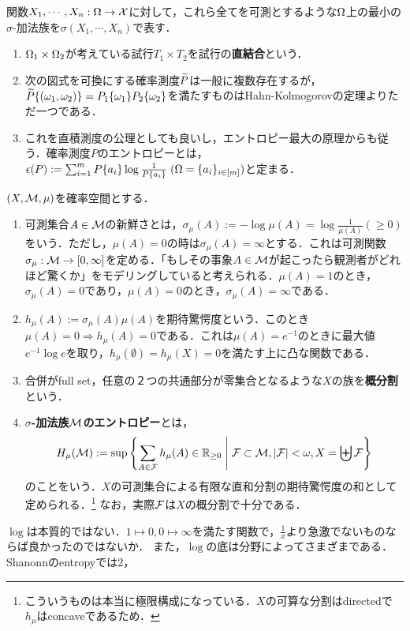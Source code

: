 \documentclass[uplatex,dvipdfmx]{jsreport}
\begin{document}
\begin{definition}
    関数$X_1,\cdots,X_n:\Omega\to\mathcal{X}$に対して，これら全てを可測とするような$\Omega$上の最小の$\sigma$-加法族を$\sigma(X_1,\cdots,X_n)$で表す．
\end{definition}

\begin{definition}\mbox{}
    \begin{enumerate}
        \item $\Omega_1\times\Omega_2$が考えている試行$T_1\times T_2$を試行の\textbf{直結合}という．
        \item 次の図式を可換にする確率測度$\widetilde{P}$は一般に複数存在するが，$\widetilde{P}\{(\omega_1,\omega_2)\}=P_1\{\omega_1\}P_2\{\omega_2\}$を満たすものはHahn-Kolmogorovの定理よりただ一つである．
        \item これを直積測度の公理としても良いし，エントロピー最大の原理からも従う．確率測度$P$のエントロピーとは，$\epsilon(P):=\sum^m_{i=1}P\{a_i\}\log\frac{1}{P\{a_i\}}\;(\Omega=\{a_i\}_{i\in[m]})$と定まる．
    \end{enumerate}
\end{definition}

\begin{definition}
    $(X,\mathcal{M},\mu)$を確率空間とする．
    \begin{enumerate}
        \item 可測集合$A\in\mathcal{M}$の新鮮さとは，$\sigma_\mu(A):=-\log\mu(A)=\log\frac{1}{\mu(A)}(\ge0)$をいう．ただし，$\mu(A)=0$の時は$\sigma_\mu(A)=\infty$とする．これは可測関数$\sigma_\mu:\mathcal{M}\to[0,\infty]$を定める．「もしその事象$A\in\mathcal{M}$が起こったら観測者がどれほど驚くか」をモデリングしていると考えられる．$\mu(A)=1$のとき，$\sigma_\mu(A)=0$であり，$\mu(A)=0$のとき，$\sigma_\mu(A)=\infty$である．
        \item $h_\mu(A):=\sigma_\mu(A)\mu(A)$を期待驚愕度という．このとき$\mu(A)=0\Rightarrow h_\mu(A)=0$である．これは$\mu(A)=e^{-1}$のときに最大値$e^{-1}\log e$を取り，$h_\mu(\emptyset)=h_\mu(X)=0$を満たす上に凸な関数である．
        \item 合併がfull set，任意の２つの共通部分が零集合となるような$X$の族を\textbf{概分割}という．
        \item \textbf{$\sigma$-加法族$\mathcal{M}$のエントロピー}とは，\[H_\mu(\mathcal{M}):=\sup\left\{\sum_{A\in\mathcal{F}}h_\mu(A)\in\mathbb{R}_{\ge0}\;\middle|\;\mathcal{F}\subset\mathcal{M},\lvert\mathcal{F}\rvert<\omega,X=\biguplus\mathcal{F}\right\}\]
        のことをいう．$X$の可測集合による有限な直和分割の期待驚愕度の和として定められる．\footnote{こういうものは本当に極限構成になっている．$X$の可算な分割はdirectedで$h_\mu$はconcaveであるため．}
        なお，実際$\mathcal{F}$は$X$の概分割で十分である．
    \end{enumerate}
\end{definition}
\begin{remarks}
    $\log$は本質的ではない．$1\mapsto 0,0\mapsto\infty$を満たす関数で，$\frac{1}{x}$より急激でないものならば良かったのではないか．
    また，$\log$の底は分野によってさまざまである．Shanonnのentropyでは$2$，
\end{remarks}
\end{document}
